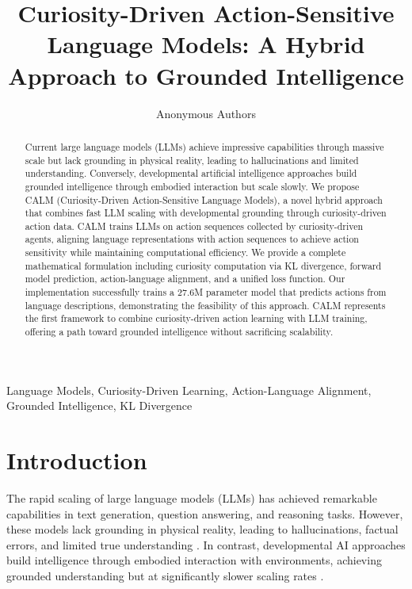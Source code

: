 \documentclass{IEEEtran}
\title{Curiosity-Driven Action-Sensitive Language Models: A Hybrid Approach to Grounded Intelligence}
\author{Anonymous Authors}
\date{}
\begin{document}
\maketitle

\begin{abstract}
Current large language models (LLMs) achieve impressive capabilities through massive scale but lack grounding in physical reality, leading to hallucinations and limited understanding. Conversely, developmental artificial intelligence approaches build grounded intelligence through embodied interaction but scale slowly. We propose CALM (Curiosity-Driven Action-Sensitive Language Models), a novel hybrid approach that combines fast LLM scaling with developmental grounding through curiosity-driven action data. CALM trains LLMs on action sequences collected by curiosity-driven agents, aligning language representations with action sequences to achieve action sensitivity while maintaining computational efficiency. We provide a complete mathematical formulation including curiosity computation via KL divergence, forward model prediction, action-language alignment, and a unified loss function. Our implementation successfully trains a 27.6M parameter model that predicts actions from language descriptions, demonstrating the feasibility of this approach. CALM represents the first framework to combine curiosity-driven action learning with LLM training, offering a path toward grounded intelligence without sacrificing scalability.
\end{abstract}

\begin{IEEEkeywords}
Language Models, Curiosity-Driven Learning, Action-Language Alignment, Grounded Intelligence, KL Divergence
\end{IEEEkeywords}

\section{Introduction}

The rapid scaling of large language models (LLMs) has achieved remarkable capabilities in text generation, question answering, and reasoning tasks. However, these models lack grounding in physical reality, leading to hallucinations, factual errors, and limited true understanding \cite{brown2020}. In contrast, developmental AI approaches build intelligence through embodied interaction with environments, achieving grounded understanding but at significantly slower scaling rates \cite{oudeyer2007}.
\end{document}

